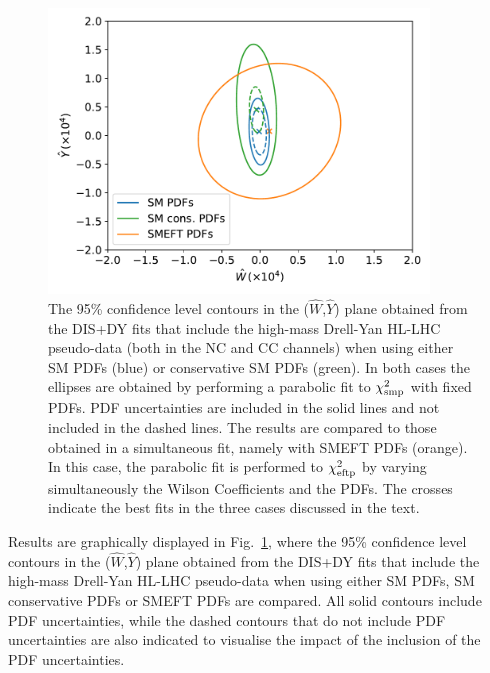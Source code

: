 \documentclass[withindex,glossary]{cam-thesis}
\begin{document}
\begin{figure}[t]
\begin{center}
  \includegraphics[width=0.9\textwidth]{dy_figures/WY-contours-sm-smeft-hl-ref-160621-2.pdf}
  \caption{\label{fig:hllhc-ellipse} The 95\% confidence level contours
    in the ($\hat{W}$,$\hat{Y}$) plane obtained from the DIS+DY fits that
    include the high-mass Drell-Yan HL-LHC pseudo-data (both in the NC
    and CC channels) 
    when using either SM PDFs (blue) or conservative SM PDFs (green). In both cases
    the ellipses are obtained by performing a parabolic fit to
    $\chi^2_{\rm smp}$ with fixed PDFs. PDF
    uncertainties are included in the solid lines and not included in
    the dashed lines.  The results are compared to
    those obtained in a simultaneous fit, namely with SMEFT PDFs
    (orange). In this case, the parabolic fit is performed to $\chi^2_{\rm eftp}$ by varying
    simultaneously the Wilson Coefficients and the PDFs. 
    The crosses indicate the best fits in the three cases discussed in
    the text. }
\end{center}
\end{figure}
Results are graphically displayed in
Fig.~\ref{fig:hllhc-ellipse}, where the 95\% confidence level contours
    in the ($\hat{W}$,$\hat{Y}$) plane obtained from the DIS+DY fits that
    include the high-mass Drell-Yan HL-LHC pseudo-data  when using either SM PDFs, SM conservative
    PDFs or SMEFT PDFs are compared. All solid contours include PDF
    uncertainties, while the dashed contours that do not include PDF
    uncertainties are also indicated to visualise the impact of the
    inclusion of the PDF uncertainties.
\end{document}
